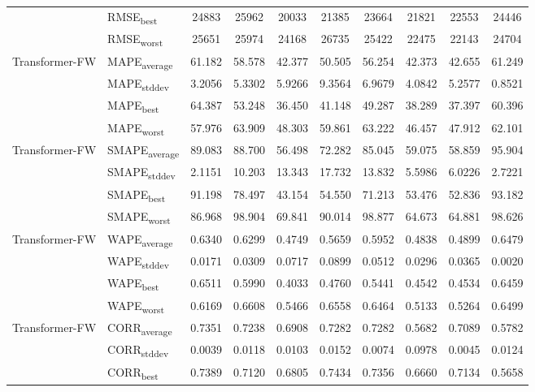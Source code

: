 {\begin{longtable}{l l c c c c c c c c}
 & RMSE\textsubscript{best} & 24883 & 25962 & 20033 & 21385 & 23664 & 21821 & 22553 & 24446 \\
 & RMSE\textsubscript{worst} & 25651 & 25974 & 24168 & 26735 & 25422 & 22475 & 22143 & 24704 \\
\cmidrule(lr){2-10}
\multirow{4}{*}{Transformer-FW} & MAPE\textsubscript{average} & 61.182 & 58.578 & 42.377 & 50.505 & 56.254 & 42.373 & 42.655 & 61.249 \\
 & MAPE\textsubscript{stddev} & 3.2056 & 5.3302 & 5.9266 & 9.3564 & 6.9679 & 4.0842 & 5.2577 & 0.8521 \\
 & MAPE\textsubscript{best} & 64.387 & 53.248 & 36.450 & 41.148 & 49.287 & 38.289 & 37.397 & 60.396 \\
 & MAPE\textsubscript{worst} & 57.976 & 63.909 & 48.303 & 59.861 & 63.222 & 46.457 & 47.912 & 62.101 \\
\cmidrule(lr){2-10}
\multirow{4}{*}{Transformer-FW} & SMAPE\textsubscript{average} & 89.083 & 88.700 & 56.498 & 72.282 & 85.045 & 59.075 & 58.859 & 95.904 \\
 & SMAPE\textsubscript{stddev} & 2.1151 & 10.203 & 13.343 & 17.732 & 13.832 & 5.5986 & 6.0226 & 2.7221 \\
 & SMAPE\textsubscript{best} & 91.198 & 78.497 & 43.154 & 54.550 & 71.213 & 53.476 & 52.836 & 93.182 \\
 & SMAPE\textsubscript{worst} & 86.968 & 98.904 & 69.841 & 90.014 & 98.877 & 64.673 & 64.881 & 98.626 \\
\cmidrule(lr){2-10}
\multirow{4}{*}{Transformer-FW} & WAPE\textsubscript{average} & 0.6340 & 0.6299 & 0.4749 & 0.5659 & 0.5952 & 0.4838 & 0.4899 & 0.6479 \\
 & WAPE\textsubscript{stddev} & 0.0171 & 0.0309 & 0.0717 & 0.0899 & 0.0512 & 0.0296 & 0.0365 & 0.0020 \\
 & WAPE\textsubscript{best} & 0.6511 & 0.5990 & 0.4033 & 0.4760 & 0.5441 & 0.4542 & 0.4534 & 0.6459 \\
 & WAPE\textsubscript{worst} & 0.6169 & 0.6608 & 0.5466 & 0.6558 & 0.6464 & 0.5133 & 0.5264 & 0.6499 \\
\cmidrule(lr){2-10}
\multirow{4}{*}{Transformer-FW} & CORR\textsubscript{average} & 0.7351 & 0.7238 & 0.6908 & 0.7282 & 0.7282 & 0.5682 & 0.7089 & 0.5782 \\
 & CORR\textsubscript{stddev} & 0.0039 & 0.0118 & 0.0103 & 0.0152 & 0.0074 & 0.0978 & 0.0045 & 0.0124 \\
 & CORR\textsubscript{best} & 0.7389 & 0.7120 & 0.6805 & 0.7434 & 0.7356 & 0.6660 & 0.7134 & 0.5658 \\

\end{longtable}}
